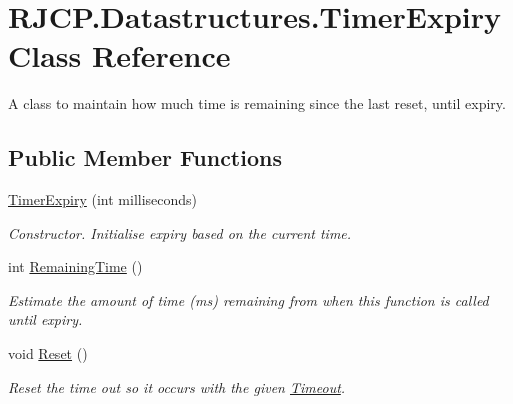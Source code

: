 \hypertarget{class_r_j_c_p_1_1_datastructures_1_1_timer_expiry}{}\section{R\+J\+C\+P.\+Datastructures.\+Timer\+Expiry Class Reference}
\label{class_r_j_c_p_1_1_datastructures_1_1_timer_expiry}


A class to maintain how much time is remaining since the last reset, until expiry.  


\subsection*{Public Member Functions}
\begin{DoxyCompactItemize}
\item 
\mbox{\hyperlink{class_r_j_c_p_1_1_datastructures_1_1_timer_expiry_a6474d821e4ace9b45cf91c074fdd2956}{Timer\+Expiry}} (int milliseconds)
\begin{DoxyCompactList}\small\item\em Constructor. Initialise expiry based on the current time. \end{DoxyCompactList}\item 
int \mbox{\hyperlink{class_r_j_c_p_1_1_datastructures_1_1_timer_expiry_aae9e5e2c9c3f6d30001e4fb04abf2244}{Remaining\+Time}} ()
\begin{DoxyCompactList}\small\item\em Estimate the amount of time (ms) remaining from when this function is called until expiry. \end{DoxyCompactList}\item 
void \mbox{\hyperlink{class_r_j_c_p_1_1_datastructures_1_1_timer_expiry_ad2241fbbdbbe1423b50f4b4b54ccbed1}{Reset}} ()
\begin{DoxyCompactList}\small\item\em Reset the time out so it occurs with the given \mbox{\hyperlink{class_r_j_c_p_1_1_datastructures_1_1_timer_expiry_ad6a62756590878b3053a15a5c112d944}{Timeout}}. \end{DoxyCompactList}\end{DoxyCompactItemize}
